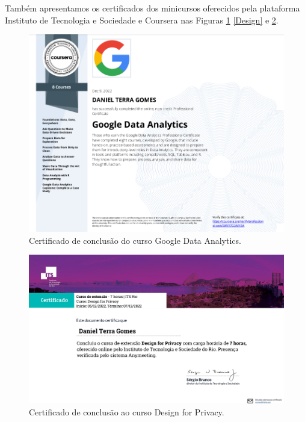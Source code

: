 Também apresentamos os certificados dos minicursos oferecidos pela plataforma Instituto de Tecnologia e Sociedade e Coursera nas Figuras \ref{Google} \ref{Design} e \ref{Direitos}.


\begin{figure}[H]
\centering
\includegraphics[width=\textwidth]{Figures/google.png}
\caption{Certificado de conclusão do curso Google Data Analytics.}
\label{Google}
\end{figure}

\begin{figure}[H]
\centering
\includegraphics[width=\textwidth]{Figures/its2.pdf}
\caption{Certificado de conclusão ao curso Design for Privacy.}
\label{Direitos}
\end{figure}

